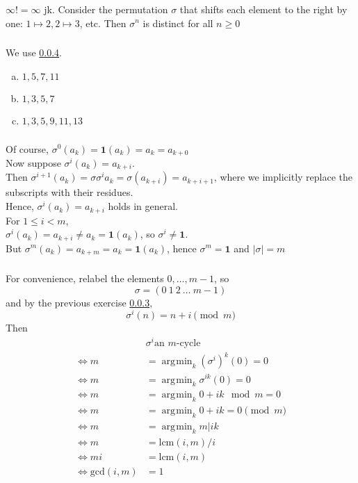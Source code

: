 \documentclass{article}
\newcommand{\id}{ \bm{1} }
\DeclareMathOperator*{\argmin}{\arg\!\min}
\begin{document}
\subsubsection{}\label{ex3p8}
$\infty! = \infty$ jk. Consider the permutation $\sigma$ that shifts each element to the right by one: $1 \mapsto 2, 2\mapsto 3$, etc. Then $\sigma^n$ is distinct for all $n \geq 0$
\subsubsection{}\label{ex3p9}
We use \ref{ex3p11}.
\begin{enumerate}[(a)]
\item $1, 5, 7, 11$
\item $1, 3, 5, 7$
\item $1, 3, 5, 9, 11, 13$
\end{enumerate}
\subsubsection{}\label{ex3p10}
Of course, $\sigma^0(a_k) = \id(a_k) = a_k = a_{k+0}$\\
Now suppose $\sigma^i(a_k) = a_{k+i}$.\\
Then $\sigma^{i+1}(a_k) = \sigma\sigma^i{a_k} = \sigma(a_{k+i}) = a_{k+i+1}$, where we implicitly replace the subscripts with their residues.\\
Hence, $\sigma^i(a_k) = a_{k+i}$ holds in general.\\
For $1 \leq i < m$,\\
$\sigma^i(a_k) = a_{k+i} \neq a_k = \id(a_k)$, so $\sigma^i \neq \id$.\\
But $\sigma^m(a_k) = a_{k+m} = a_k = \id(a_k)$, hence $\sigma^m = \id$ and $|\sigma| = m$
\subsubsection{}\label{ex3p11}
For convenience, relabel the elements $0, \ldots, m-1$, so
\begin{equation*}
\sigma = (0\ 1\ 2\ \ldots\ m-1)
\end{equation*}
and by the previous exercise \ref{ex3p10}, 
\begin{equation*}
\sigma^i(n) = n+i \pmod{m}
\end{equation*}
Then
\begin{align}
& \sigma^i \mbox{an $m$-cycle} \\
\iff m &= \argmin_k (\sigma^i)^k(0) = 0\\
\iff m &= \argmin_k \sigma^{ik}(0) = 0\\
\iff m &= \argmin_k 0 + ik \mod{m} = 0\\
\iff m &= \argmin_k 0 + ik = 0 \pmod{m}\\
\iff m &= \argmin_k m | ik\\ \label{athing1}
\iff m &= \mbox{lcm}(i,m)/i\\ \label{athing2}
\iff mi &= \mbox{lcm}(i,m)\\
\iff \mbox{gcd}(i,m) &= 1 \label{athing3}
\end{align}
\end{document}

